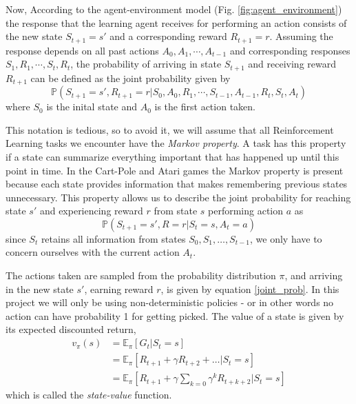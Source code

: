 \documentclass[11pt]{article}
\begin{document}
Now, According to the agent-environment model (Fig. \ref{fig:agent_environment}) the response that
the learning agent receives for performing an action consists
of the new state $S_{t+1} = s'$ and a corresponding reward $R_{t+1} = r$.
Assuming the response depends on all past actions $A_{0}, A_{1}, \cdots, A_{t-1}$ and
corresponding responses $S_{1}, R_{1}, \cdots, S_{t}, R_{t}$, the probability
of arriving in state $S_{t+1}$ and receiving reward $R_{t+1}$ can be defined as the
joint probability given by
\begin{equation}
    \mathds{P}(S_{t+1} = s', R_{t+1} = r | S_0, A_0, R_1, \cdots, S_{t-1}, A_{t-1}, R_{t}, S_{t}, A_{t})
\end{equation}
where $S_0$ is the inital state and $A_0$ is the first action taken.

This notation is tedious, so to avoid it, we will assume that all Reinforcement Learning tasks
we encounter have the \textit{Markov property}.
A task has this property if a state can summarize everything important that
has happened up until this point in time.
In the Cart-Pole and Atari games the Markov property is present because each state provides
information that makes remembering previous states unnecessary.
This property allows us to describe the joint probability for reaching state $s'$ and
experiencing reward $r$ from state $s$ performing action $a$ as
\begin{equation}\label{joint_prob}
    \mathds{P}(S_{t+1} = s', R = r | S_t = s, A_t = a)
\end{equation}
since $S_t$ retains all information from states $S_0, S_1, \dots, S_{t-1}$,
we only have to concern ourselves with the current action $A_t$.

The actions taken are sampled from the probability distribution $\pi$,
and arriving in the new state $s'$, earning reward $r$, is given by equation \ref{joint_prob}.
In this project we will only be using non-deterministic policies - or in other words
no action can have probability 1 for getting picked.
The value of a state is given by its expected discounted return,
\begin{equation}
    \begin{aligned}
        v_\pi(s) & = \mathds{E}_\pi[G_t | S_t = s]\\
        & = \mathds{E}_\pi[R_{t+1} + \gamma R_{t+2} + \dots | S_t = s]\\
        & = \mathds{E}_\pi[R_{t+1} + \gamma \sum\limits_{k=0} \gamma^k R_{t+k+2} | S_t = s]
    \end{aligned}
\end{equation}
which is called the \textit{state-value} function.
\end{document}
